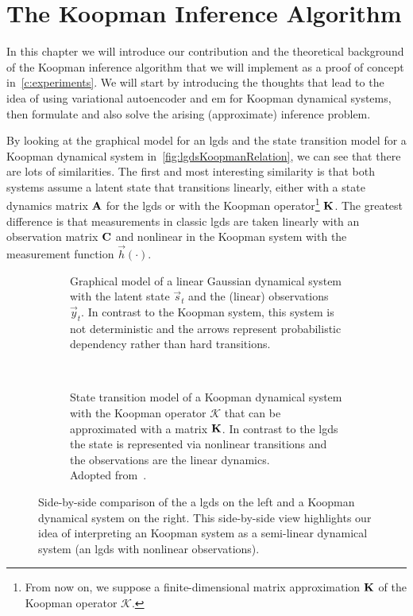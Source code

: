 \chapter{The Koopman Inference Algorithm}
\label{c:nonlinearGaussianKoopman}



In this chapter we will introduce our contribution and the theoretical background of the Koopman inference algorithm that we will implement as a proof of concept in~\autoref{c:experiments}. We will start by introducing the thoughts that lead to the idea of using variational autoencoder and \ac{em} for Koopman dynamical systems, then formulate and also solve the arising (approximate) inference problem.

By looking at the graphical model for an \ac{lgds} and the state transition model for a Koopman dynamical system in~\autoref{fig:lgdsKoopmanRelation}, we can see that there are lots of similarities. The first and most interesting similarity is that both systems assume a latent state that transitions linearly, either with a state dynamics matrix \(\boldsymbol{\mathrm{A}}\) for the \ac{lgds} or with the Koopman operator\footnote{From now on, we suppose a finite-dimensional matrix approximation \(\boldsymbol{\mathrm{K}}\) of the Koopman operator \(\mathcal{K}\).} \(\boldsymbol{\mathrm{K}}\). The greatest difference is that measurements in classic \ac{lgds} are taken linearly with an observation matrix \( \boldsymbol{\mathrm{C}} \) and nonlinear in the Koopman system with the measurement function \( \vec{h}(\cdot) \).

\begin{figure}
	\centering
	\begin{subfigure}[t]{0.5\linewidth}
		\centering
		\resizebox{\linewidth}{!}{\tikzLinearGaussianDynamicalSystem}
		\caption[Graphical model of a LGDS]{Graphical model of a linear Gaussian dynamical system with the latent state \(\vec{s}_t\) and the (linear) observations \(\vec{y}_t\). In contrast to the Koopman system, this system is not deterministic and the arrows represent probabilistic dependency rather than hard transitions.}
	\end{subfigure}%
	~
	\begin{subfigure}[t]{0.5\linewidth}
		\centering
		\resizebox{\linewidth}{!}{\tikzKoopmanOperator}
		\caption[State transition model of a Koopman dynamical system]{State transition model of a Koopman dynamical system with the Koopman operator \( \mathcal{K} \) that can be approximated with a matrix \(\boldsymbol{\mathrm{K}}\). In contrast to the \ac{lgds} the state is represented via nonlinear transitions and the observations are the linear dynamics. \\ Adopted from~\cite{bruntonKoopmanInvariantSubspaces2016}.}
	\end{subfigure}
	\caption[Side-by-side comparison of a LGDS and a Koopman dynamical system]{Side-by-side comparison of the a \ac{lgds} on the left and a Koopman dynamical system on the right. This side-by-side view highlights our idea of interpreting an Koopman system as a semi-linear dynamical system (\ie an \ac{lgds} with nonlinear observations).}
	\label{fig:lgdsKoopmanRelation}
\end{figure}

